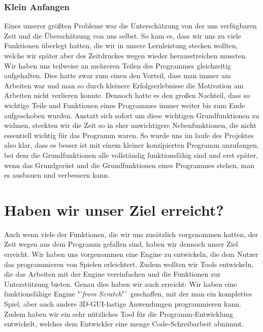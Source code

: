 \subsubsection{Klein Anfangen}
\label{kleinanfangen}
Eines unserer größten Probleme war die Unterschätzung von der uns verfügbaren Zeit und die Überschätzung von uns selbst. So kam es, dass wir uns zu viele Funktionen überlegt hatten, die wir in unsere Lernleistung stecken wollten, welche wir später aber des Zeitdruckes wegen wieder herausstreichen mussten. 
Wir haben uns teilweise an mehreren Teilen des Programmes gleichzeitig aufgehalten. Dies hatte zwar zum einen den Vorteil, dass man immer am Arbeiten war und man so durch kleinere Erfolgserlebnisse die Motivation am Arbeiten nicht verlieren konnte. Dennoch hatte es den großen Nachteil, dass so wichtige Teile und Funktionen eines Programmes immer weiter bis zum Ende aufgeschoben wurden. Anstatt sich sofort um diese wichtigen Grundfunktionen zu widmen, steckten wir die Zeit so in eher unwichtigere Nebenfunktionen, die nicht essentiell wichtig für das Programm waren.
So wurde uns im laufe des Projektes  also klar, dass es besser ist mit einem kleiner konzipierten Programm anzufangen, bei dem die Grundfunktionen alle vollständig funktionsfähig sind und erst später, wenn das Grundgerüst und die Grundfunktionen eines Programmes stehen, man es ausbauen und verbessern kann. 

\section{Haben wir unser Ziel erreicht?}
Auch wenn viele der Funktionen, die wir uns zusätzlich vorgenommen hatten, der Zeit wegen aus dem Programm gefallen sind, haben wir dennoch unser Ziel erreicht. Wir haben uns vorgenommen eine Engine zu entwickeln, die dem Nutzer das programmieren von Spielen erleichtert. Zudem wollten wir Tools entwickeln, die das Arbeiten mit der Engine vereinfachen und die Funktionen zur Unterstützung bieten.
Genau dies haben wir auch erreicht:
Wir haben eine funktionsfähige Engine "'\textit{from Scratch}"` geschaffen, mit der man ein komplettes Spiel, aber auch andere 3D-GUI-lastige Anwendungen programmieren kann. Zudem haben wir ein sehr nützliches Tool für die Programm-Entwicklung entwickelt, welches dem Entwickler eine menge Code-Schreibarbeit abnimmt. 

